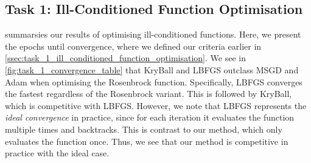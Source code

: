 \subsection{Task 1: Ill-Conditioned Function Optimisation}
\label{ssec:results_ill_conditioned_function_optimisation}

 summarsies our results of optimising ill-conditioned functions. Here, we present the epochs until convergence, where we defined our criteria earlier in \cref{ssec:task_1_ill_conditioned_function_optimisation}. We see in \cref{fig:task_1_convergence_table} that KryBall and LBFGS outclass MSGD and Adam when optimising the Rosenbrock function. Specifically, LBFGS converges the fastest regardless of the Rosenbrock variant. This is followed by KryBall, which is competitive with LBFGS. However, we note that LBFGS represents the \textit{ideal convergence} in practice, since for each iteration it evaluates the function multiple times and backtracks. This is contrast to our method, which only evaluates the function once. Thus, we see that our method is competitive in practice with the ideal case. 

